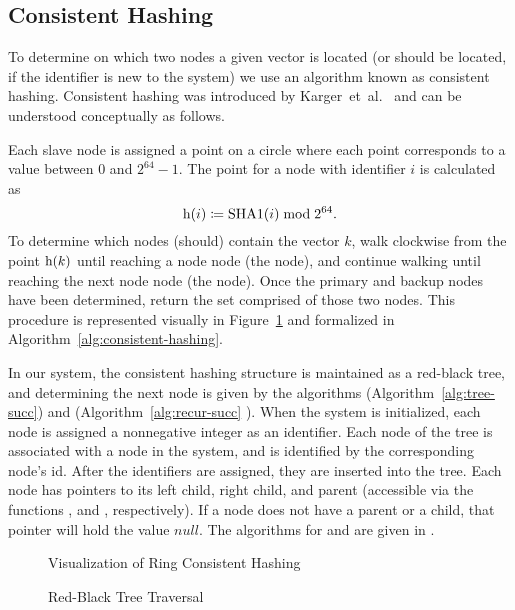 \subsection{Consistent Hashing}
To determine on which two nodes a given vector is located (or should be
located, if the identifier is new to the system) we use an algorithm known as
consistent hashing. Consistent hashing was introduced by
Karger~et~al.~\cite{karger1997} and can be understood conceptually as follows.
\par
Each slave node is assigned a point on a circle where each point corresponds
to a value between \(0\) and \(2^{64} - 1\). The point for a node with
identifier \(i\) is calculated as
\begin{equation*}
    \mathrm{h}(i) \coloneqq \mathrm{SHA1}(i) \bmod{2^{64}}.
\end{equation*}
To determine which nodes (should) contain the vector \(k\), walk clockwise
from the point \(\mathrm{h}(k)\) until reaching a node node (the
 node), and continue walking until reaching the next node node
(the  node). Once the primary and backup nodes have been
determined, return the set comprised of those two nodes. This procedure is
represented visually in Figure~\ref{fig:ring-hash-process} and formalized in
Algorithm~\ref{alg:consistent-hashing}.
%
\par
In our system, the consistent hashing structure is maintained as a red-black
tree, and determining the next node is given by the algorithms
 (Algorithm~\ref{alg:tree-succ}) and
 (Algorithm~\ref{alg:recur-succ}
\cite{bstPredecessorSuccessor}). When the system is initialized, each node
is assigned a nonnegative integer as an identifier. Each node of the tree is
associated with a node in the system, and is identified by the corresponding
node's id. After the identifiers are assigned, they are inserted into the
tree. Each node has pointers to its left child, right child, and parent
(accessible via the functions ,  and
, respectively). If a node does not have a parent or a child,
that pointer will hold the value \(null\). The algorithms for
 and  are given in \cite{cormen2009}.
%
\begin{figure}
    \centering
    
    \caption{Visualization of Ring Consistent Hashing}
    \label{fig:ring-hash-process}
\end{figure}
%
\begin{figure}
    \centering
    
    \caption{Red-Black Tree Traversal}
    \label{fig:tree-traversal}
\end{figure}
